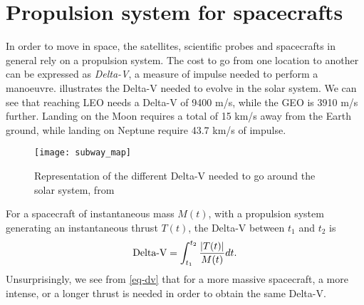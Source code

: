 


\section*{Propulsion system for spacecrafts}
\label{sec-propulsion}


In order to move in space, the satellites, scientific probes and spacecrafts in general rely on a propulsion system.
The cost to go from one location to another can be expressed as \emph{Delta-V}, a measure of impulse needed to perform a manoeuvre.
 illustrates the Delta-V needed to evolve in the solar system.
We can see that reaching \ac{LEO} needs a Delta-V of 9400 m/s, while the \ac{GEO} is 3910 m/s further.
Landing on the Moon requires a total of 15 km/s away from the Earth ground, while landing on Neptune require 43.7 km/s of impulse.
\begin{figure}[hbtp]
  \centering
  \texttt{[image: subway\_map]}
  \caption{Representation of the different Delta-V needed to go around the solar system, from \citet{reddit-subway}}
  \label{fig-subway_DV}
\end{figure}

For a spacecraft of instantaneous mass $M(t)$, with a propulsion system generating an instantaneous thrust $T(t)$, the Delta-V between $t_1$ and $t_2$ is
\begin{equation} \label{eq-dv}
  \text{Delta-V} = \int_{t_1}^{t_2} \frac{ \lvert T(t)\rvert}{M(t)} dt.
\end{equation}
Unsurprisingly, we see from \cref{eq-dv} that for a more massive spacecraft, a more intense, or a longer thrust is needed in order to obtain the same Delta-V.

